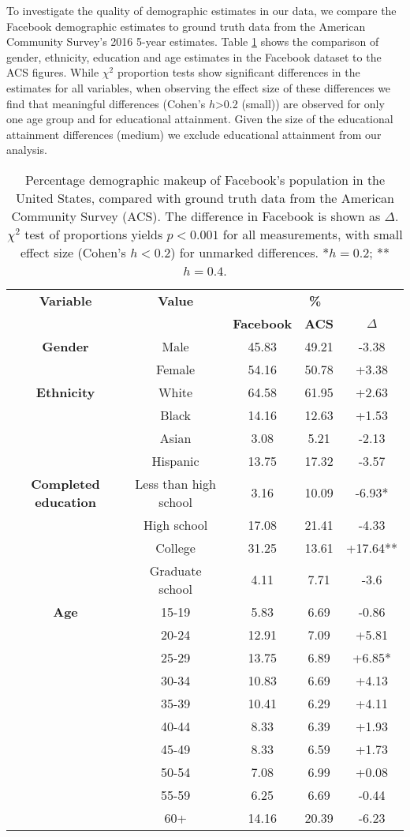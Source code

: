 To investigate the quality of demographic estimates in our data, we compare the Facebook demographic estimates to ground truth data from the American Community Survey's 2016 5-year estimates. Table \ref{tab:comparison} shows the comparison of gender, ethnicity, education and age estimates in the Facebook dataset to the ACS figures. While $\chi^2$ proportion tests show significant differences in the estimates for all variables, when observing the effect size of these differences we find that meaningful differences (Cohen's $h$>0.2 (small)) are observed for only one age group and for educational attainment. Given the size of the educational attainment differences (medium) we exclude educational attainment from our analysis. 

\begin{table}
\centering
\begin{tabular}{c | c | c | c | c} 
\toprule
\textbf{Variable} & \textbf{Value} & \multicolumn{3}{c}{\textbf{\%}}\\
& & \textbf{Facebook} & \textbf{ACS} & \textbf{$\Delta$}\\
 \hline
\textbf{Gender} & Male & 45.83 & 49.21 & -3.38\\
& Female & 54.16 & 50.78 & +3.38\\
 \midrule
 \textbf{Ethnicity} & White & 64.58 & 61.95 & +2.63\\
 & Black & 14.16 & 12.63 & +1.53\\
 & Asian & 3.08 & 5.21 & -2.13\\
 & Hispanic & 13.75 & 17.32 & -3.57\\
 \midrule
 \textbf{Completed education} & Less than high school & 3.16 & 10.09 & -6.93*\\
 & High school & 17.08 & 21.41 & -4.33\\
 & College & 31.25 & 13.61 & +17.64**\\
 & Graduate school & 4.11 & 7.71 & -3.6\\
 \midrule
 \textbf{Age} & 15-19 & 5.83 & 6.69 & -0.86\\
 & 20-24 & 12.91 & 7.09 & +5.81\\
 & 25-29 & 13.75 & 6.89 & +6.85*\\
 & 30-34 & 10.83 & 6.69 & +4.13\\
 & 35-39 & 10.41 & 6.29 & +4.11\\
 & 40-44 & 8.33 & 6.39 & +1.93\\
 & 45-49 & 8.33 & 6.59 & +1.73\\
 & 50-54 & 7.08 & 6.99 & +0.08\\
 & 55-59 & 6.25 & 6.69 & -0.44\\
 & 60+ & 14.16 & 20.39 & -6.23\\ 
 \bottomrule
\end{tabular}
\caption{Percentage demographic makeup of Facebook's population in the United States, compared with ground truth data from the American Community Survey (ACS). The difference in Facebook is shown as $\Delta$. $\chi^2$ test of proportions yields $p < 0.001$ for all measurements, with small effect size (Cohen's $h < 0.2$) for unmarked differences. *$h = 0.2$; **$h = 0.4$.}
\label{tab:comparison}
\end{table}

